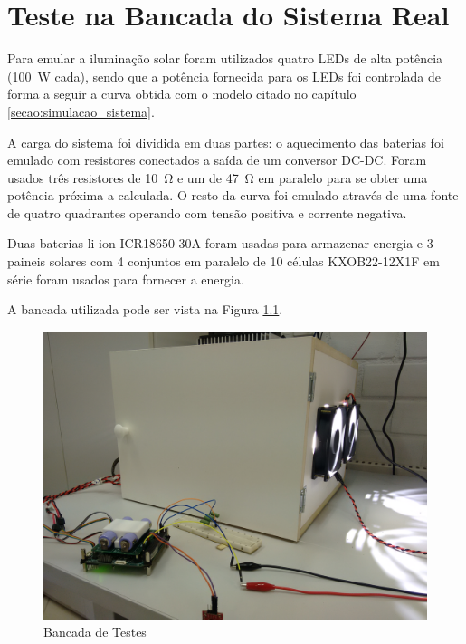 \chapter{Teste na Bancada do Sistema Real} \label{secao:teste_sistema}

Para emular a iluminação solar foram utilizados quatro LEDs de alta potência (\SI{100}{\watt} cada), sendo que a potência fornecida para os LEDs foi controlada de forma a seguir a curva obtida com o modelo citado no capítulo \ref{secao:simulacao_sistema}.

A carga do sistema foi dividida em duas partes: o aquecimento das baterias foi emulado com resistores conectados a saída de um conversor DC-DC. Foram usados três resistores de \SI{10}{\ohm} e um de \SI{47}{\ohm} em paralelo para se obter uma potência próxima a calculada. O resto da curva foi emulado através de uma fonte de quatro quadrantes operando com tensão positiva e corrente negativa.

Duas baterias li-ion ICR18650-30A foram usadas para armazenar energia e 3 paineis solares com 4 conjuntos em paralelo de 10 células KXOB22-12X1F em série foram usados para fornecer a energia.

A bancada utilizada pode ser vista na Figura \ref{figura_bancada_teste}.

\begin{figure}[!htpb]
\begin{center}
\includegraphics[scale=0.05]{figures/bancada.jpg}
\caption{Bancada de Testes}
\label{figura_bancada_teste}
\end{center}
\end{figure}

